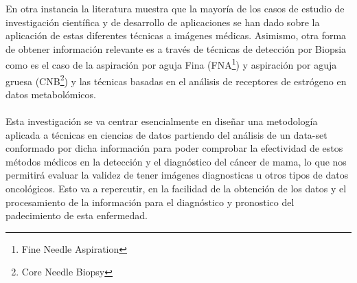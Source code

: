 En otra instancia la literatura muestra que la mayoría de los casos de estudio de investigación científica y de desarrollo de aplicaciones se han dado sobre la aplicación de estas diferentes técnicas a imágenes médicas. Asimismo, otra forma de obtener información relevante es a través de técnicas de detección por Biopsia como es el caso de la aspiración por aguja Fina (FNA\footnote{Fine Needle Aspiration}) y aspiración por aguja gruesa (CNB\footnote{Core Needle Biopsy}) y las técnicas basadas en el análisis de receptores de estrógeno en datos metabolómicos. 
\\\\
Esta investigación se va centrar esencialmente en diseñar una metodología aplicada a técnicas en ciencias de datos partiendo del análisis de un data-set conformado por dicha información para poder comprobar la efectividad de estos métodos médicos en la detección y el diagnóstico del cáncer de mama, lo que nos permitirá evaluar la validez de tener imágenes diagnosticas u otros tipos de datos oncológicos. Esto va a repercutir, en la facilidad de la obtención de los datos y el procesamiento de la información para el diagnóstico y pronostico del padecimiento de esta enfermedad.
